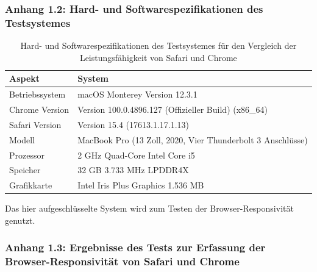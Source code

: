\documentclass[a4paper]{scrartcl}
\begin{document}
\newpage

\subsubsection*{Anhang 1.2: Hard- und Softwarespezifikationen des Testsystemes}

\begin{table}[H]
	\centering
	\caption{Hard- und Softwarespezifikationen des Testsystemes für den Vergleich der Leistungsfähigkeit von Safari und Chrome}
	\begin{center}
		\begin{tabularx}{\linewidth}{| l | X |}
			\hline
			Aspekt & System \\ 
			\hline \hline
			Betriebssystem & macOS Monterey Version 12.3.1 \\
			\hline
			Chrome Version & Version 100.0.4896.127 (Offizieller Build) (x86\_64) \\
			\hline
			Safari Version & Version 15.4 (17613.1.17.1.13) \\
			\hline
			Modell & MacBook Pro (13 Zoll, 2020, Vier Thunderbolt 3 Anschlüsse) \\
			\hline
			Prozessor & 2 GHz Quad-Core Intel Core i5 \\
			\hline
			Speicher & 32 GB 3.733 MHz LPDDR4X \\
			\hline
			Grafikkarte & Intel Iris Plus Graphics 1.536 MB \\
			\hline
		\end{tabularx}
	\end{center}
	Das hier aufgeschlüsselte System wird zum Testen der Browser-Responsivität genutzt.
\end{table}

\newpage

\subsubsection*{Anhang 1.3: Ergebnisse des Tests zur Erfassung der Browser-Responsivität von Safari und Chrome}
\end{document}
